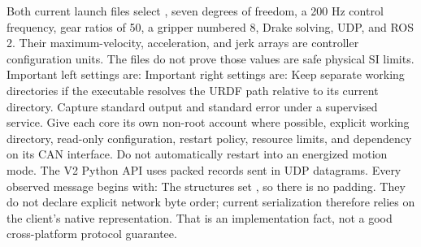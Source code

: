 {}Both current launch files select , seven degrees of freedom, a 200 Hz control frequency, gear ratios of 50, a gripper numbered 8, Drake solving, UDP, and ROS 2. Their maximum-velocity, acceleration, and jerk arrays are controller configuration units. The files do not prove those values are safe physical SI limits.\markdownRendererParagraphSeparator
{}Important left settings are:\markdownRendererInterblockSeparator
{}\markdownRendererInterblockSeparator
{}Important right settings are:\markdownRendererInterblockSeparator
{}\markdownRendererInterblockSeparator
{}Keep separate working directories if the executable resolves the URDF path relative to its current directory. Capture standard output and standard error under a supervised service. Give each core its own non-root account where possible, explicit working directory, read-only configuration, restart policy, resource limits, and dependency on its CAN interface. Do not automatically restart into an energized motion mode.\markdownRendererInterblockSeparator
{}
\markdownRendererSectionEnd \markdownRendererSectionBegin
{}\markdownRendererInterblockSeparator
{}The V2 Python API uses packed  records sent in UDP datagrams. Every observed message begins with:\markdownRendererInterblockSeparator
{}\markdownRendererInterblockSeparator
{}The structures set , so there is no padding. They do not declare explicit network byte order; current serialization therefore relies on the client's native representation. That is an implementation fact, not a good cross-platform protocol guarantee.\markdownRendererInterblockSeparator
{}\markdownRendererSectionBegin
{}\markdownRendererInterblockSeparator
